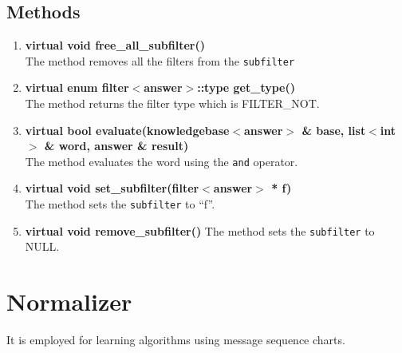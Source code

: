 \subsection*{Methods}
\begin{enumerate}
 \item \textbf{virtual void free\_all\_subfilter()} \\
	The method removes all the filters from the \texttt{subfilter}
 \item \textbf{virtual enum filter$<$answer$>$::type get\_type()} \\
	The method returns the filter type which is FILTER\_NOT.
 \item \textbf{virtual bool evaluate(knowledgebase$<$answer$>$ \& base, list$<$int$>$ \& word, answer \& result)} \\
	The method evaluates the word using the \texttt{and} operator.
 \item \textbf{virtual void set\_subfilter(filter$<$answer$>$ * f)} \\
	The method sets the \texttt{subfilter} to ``f''.
 \item \textbf{virtual void remove\_subfilter()}
	The method sets the \texttt{subfilter} to NULL.

\end{enumerate}


\section{Normalizer}

It is employed for learning algorithms using message sequence charts. 